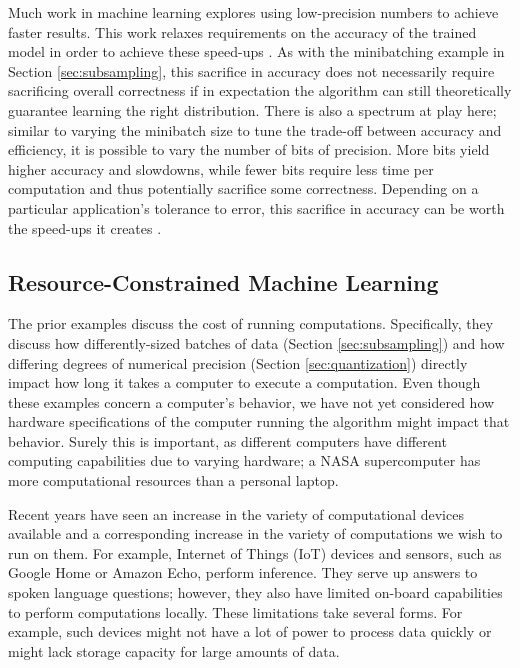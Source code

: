 \documentclass[sigplan,screen]{acmart}
\begin{document}
Much work in machine learning explores using low-precision numbers to achieve faster results. This work relaxes requirements on the accuracy of the trained model in order to achieve these speed-ups \cite{desa2017async, gong2014quantize, courbariaux2015binaryconnect, alistarh2017qsgd, gupta2015lowprecision,han2015deep}. As with the minibatching example in Section \ref{sec:subsampling}, this sacrifice in accuracy does not necessarily require sacrificing overall correctness if in expectation the algorithm can still theoretically guarantee learning the right distribution. There is also a spectrum at play here; similar to varying the minibatch size to tune the trade-off between accuracy and efficiency, it is possible to vary the number of bits of precision. More bits yield higher accuracy and slowdowns, while fewer bits require less time per computation and thus potentially sacrifice some correctness. Depending on a particular application's tolerance to error, this sacrifice in accuracy can be worth the speed-ups it creates \cite{desa2018halp}.

\subsection{Resource-Constrained Machine Learning} \label{sec:resources}
The prior examples discuss the cost of running computations. Specifically, they discuss how differently-sized batches of data (Section \ref{sec:subsampling}) and how differing degrees of numerical precision (Section \ref{sec:quantization}) directly impact how long it takes a computer to execute a computation. Even though these examples concern a computer's behavior, we have not yet considered how hardware specifications of the computer running the algorithm might impact that behavior. Surely this is important, as different computers have different computing capabilities due to varying hardware; a NASA supercomputer has more computational resources than a personal laptop.

Recent years have seen an increase in the variety of computational devices available and a corresponding increase in the variety of computations we wish to run on them. For example, Internet of Things (IoT) devices and sensors, such as Google Home or Amazon Echo, perform inference. They serve up answers to spoken language questions; however, they also have limited on-board capabilities to perform computations locally. These limitations take several forms. For example, such devices might not have a lot of power to process data quickly or might lack storage capacity for large amounts of data.
\end{document}
